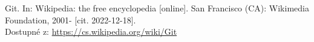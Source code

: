 \documentclass[main.tex]{subfiles}
\begin{document}
\renewcommand{\refname}{Seznam použité literatury a~zdrojů informací} 

\begin{thebibliography}{99}

 Git. In: Wikipedia: the free encyclopedia [online]. San Francisco (CA): Wikimedia Foundation, 2001- [cit. 2022-12-18].\\ Dostupné z: \url{https://cs.wikipedia.org/wiki/Git}



\end{thebibliography}
\end{document}
